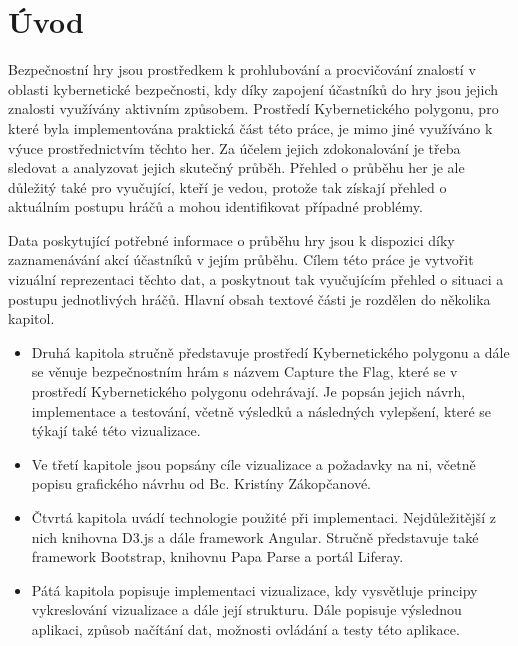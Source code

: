 \documentclass[
  digital, %
  oneside, %
  table,   %
  nolof,     %
  nolot,     %
  nocover
]{fithesis3}
\begin{document}
\chapter{Úvod}
Bezpečnostní hry jsou prostředkem k prohlubování a procvičování znalostí v oblasti kybernetické bezpečnosti, kdy díky zapojení účastníků do hry jsou jejich znalosti využívány aktivním způsobem. Prostředí Kybernetického polygonu, pro které byla implementována praktická část této práce, je mimo jiné využíváno k výuce prostřednictvím těchto her. Za účelem jejich zdokonalování je třeba sledovat a analyzovat jejich skutečný průběh. Přehled o průběhu her je ale důležitý také pro vyučující, kteří je vedou, protože tak získají přehled o aktuálním postupu hráčů a mohou identifikovat případné problémy.\par
Data poskytující potřebné informace o průběhu hry jsou k dispozici díky zaznamenávání akcí účastníků v jejím průběhu. Cílem této práce je vytvořit vizuální reprezentaci těchto dat, a poskytnout tak vyučujícím přehled o situaci a postupu jednotlivých hráčů.
Hlavní obsah textové části je rozdělen do několika kapitol.
\begin{itemize}
  \item Druhá kapitola stručně představuje prostředí Kybernetického polygonu a dále se věnuje bezpečnostním hrám s názvem Capture the Flag, které se v prostředí Kybernetického polygonu odehrávají. Je popsán jejich návrh, implementace a testování, včetně výsledků a následných vylepšení, které se týkají také této vizualizace.
  \item Ve třetí kapitole jsou popsány cíle vizualizace a požadavky na ni, včetně popisu grafického návrhu od Bc. Kristíny Zákopčanové.
  \item Čtvrtá kapitola uvádí technologie použité při implementaci. Nejdůležitější z nich knihovna D3.js a dále framework Angular. Stručně představuje také framework Bootstrap, knihovnu Papa Parse a portál Liferay.
  \item Pátá kapitola popisuje implementaci vizualizace, kdy vysvětluje principy vykreslování vizualizace a dále její strukturu. Dále popisuje výslednou aplikaci, způsob načítání dat, možnosti ovládání a testy této aplikace.
\end{itemize}
\end{document}
